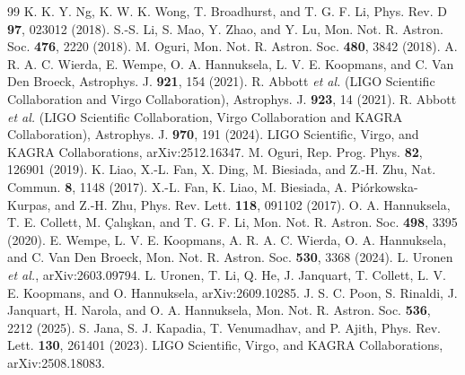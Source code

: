 \begin{thebibliography}{99}
K. K. Y. Ng, K. W. K. Wong, T. Broadhurst, and T. G. F. Li, Phys. Rev. D \textbf{97}, 023012 (2018).
S.-S. Li, S. Mao, Y. Zhao, and Y. Lu, Mon. Not. R. Astron. Soc. \textbf{476}, 2220 (2018).
M. Oguri, Mon. Not. R. Astron. Soc. \textbf{480}, 3842 (2018).
A. R. A. C. Wierda, E. Wempe, O. A. Hannuksela, L. V. E. Koopmans, and C. Van Den Broeck, Astrophys. J. \textbf{921}, 154 (2021).
R. Abbott \textit{et al.} (LIGO Scientific Collaboration and Virgo Collaboration), Astrophys. J. \textbf{923}, 14 (2021).
R. Abbott \textit{et al.} (LIGO Scientific Collaboration, Virgo Collaboration and KAGRA Collaboration), Astrophys. J. \textbf{970}, 191 (2024).
LIGO Scientific, Virgo, and KAGRA Collaborations, arXiv:2512.16347.
M. Oguri, Rep. Prog. Phys. \textbf{82}, 126901 (2019).
K. Liao, X.-L. Fan, X. Ding, M. Biesiada, and Z.-H. Zhu, Nat. Commun. \textbf{8}, 1148 (2017).
X.-L. Fan, K. Liao, M. Biesiada, A. Pi{\'o}rkowska-Kurpas, and Z.-H. Zhu, Phys. Rev. Lett. \textbf{118}, 091102 (2017).
O. A. Hannuksela, T. E. Collett, M. {\c{C}}al{\i}{\c{s}}kan, and T. G. F. Li, Mon. Not. R. Astron. Soc. \textbf{498}, 3395 (2020).
E. Wempe, L. V. E. Koopmans, A. R. A. C. Wierda, O. A. Hannuksela, and C. Van Den Broeck, Mon. Not. R. Astron. Soc. \textbf{530}, 3368 (2024).
L. Uronen \textit{et al.}, arXiv:2603.09794.
L. Uronen, T. Li, Q. He, J. Janquart, T. Collett, L. V. E. Koopmans, and O. Hannuksela, arXiv:2609.10285.
J. S. C. Poon, S. Rinaldi, J. Janquart, H. Narola, and O. A. Hannuksela, Mon. Not. R. Astron. Soc. \textbf{536}, 2212 (2025).
S. Jana, S. J. Kapadia, T. Venumadhav, and P. Ajith, Phys. Rev. Lett. \textbf{130}, 261401 (2023).
LIGO Scientific, Virgo, and KAGRA Collaborations, arXiv:2508.18083.

\end{thebibliography}
